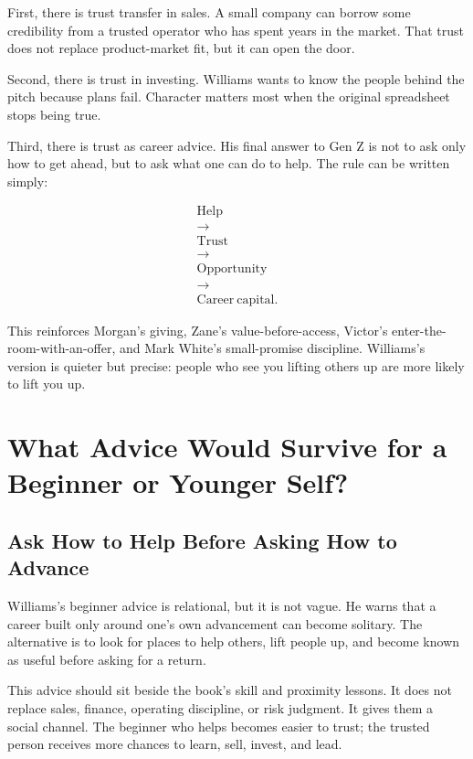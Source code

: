 \documentclass[11pt,oneside]{book}
\begin{document}
First, there is trust transfer in sales. A small company can borrow some credibility from a trusted operator who has spent years in the market. That trust does not replace product-market fit, but it can open the door.

Second, there is trust in investing. Williams wants to know the people behind the pitch because plans fail. Character matters most when the original spreadsheet stops being true.

Third, there is trust as career advice. His final answer to Gen Z is not to ask only how to get ahead, but to ask what one can do to help. The rule can be written simply:

\begin{equation}
\begin{gathered}
\mathrm{Help}\\
\longrightarrow\\
\mathrm{Trust}\\
\longrightarrow\\
\mathrm{Opportunity}\\
\longrightarrow\\
\mathrm{Career\ capital}.
\end{gathered}
\end{equation}

This reinforces Morgan's giving, Zane's value-before-access, Victor's enter-the-room-with-an-offer, and Mark White's small-promise discipline. Williams's version is quieter but precise: people who see you lifting others up are more likely to lift you up.

\chapter{What Advice Would Survive for a Beginner or Younger Self?}

\section{Ask How to Help Before Asking How to Advance}

Williams's beginner advice is relational, but it is not vague. He warns that a career built only around one's own advancement can become solitary. The alternative is to look for places to help others, lift people up, and become known as useful before asking for a return.

This advice should sit beside the book's skill and proximity lessons. It does not replace sales, finance, operating discipline, or risk judgment. It gives them a social channel. The beginner who helps becomes easier to trust; the trusted person receives more chances to learn, sell, invest, and lead.
\end{document}
